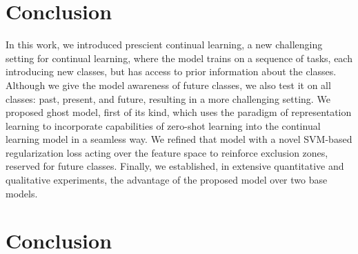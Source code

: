 
\section{Conclusion}

In this work, we introduced prescient continual learning, a new challenging setting for continual
learning, where the model trains on a sequence of tasks, each introducing new classes, but has
access to prior information about the classes. Although we give the model awareness of future
classes, we also test it on all classes: past, present, and future, resulting in a more challenging
setting. We proposed ghost model, first of its kind, which uses the paradigm of representation
learning to incorporate capabilities of zero-shot learning into the continual learning model in a
seamless way. We refined that model with a novel SVM-based regularization loss acting over the
feature space to reinforce exclusion zones, reserved for future classes. Finally, we established, in
extensive quantitative and qualitative experiments, the advantage of the proposed model over two
base models.


\section{Conclusion}

